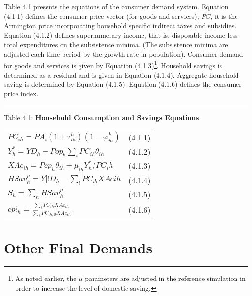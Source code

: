 \documentclass{article}
\begin{document}
Table 4.1 presents the equations of the consumer demand system. Equation (4.1.1) defines the consumer price vector (for goods and services), $PC$, it is the Armington price incorporating household specific indirect taxes and subsidies. Equation (4.1.2) defines supernumerary income, that is, disposable income less total expenditures on the subsistence minima. (The subsistence minima are adjusted each time period by the growth rate in population). Consumer demand for goods and services is given by Equation (4.1.3)\footnote{ As noted earlier, the $\mu$ parameters are adjusted in the reference simulation in order to increase the level of domestic saving.}. Household savings is determined as a residual and is given in Equation (4.1.4). Aggregate household saving is determined by Equation (4.1.5). Equation (4.1.6) defines the consumer price index.

\newpage

\noindent\rule{\linewidth}{0.4pt}
\begin{center}
\begin{large}
{\centering Table 4.1: \textbf{Household Consumption and Savings Equations} \par}

\begin{tabular}{>{\raggedright}p{} l}

$PC_{ih} = P\!A_i\left(1 + \tau^h_{ih}\right)\left(1 - \varphi^h_{ih}\right)$ & (4.1.1)\\[15pt]

$Y^*_h = Y\!D_h - Pop_h \displaystyle \sum_i PC_{ih} \theta_{ih}$ & (4.1.2)\\[15pt]

$XAc_{ih} = Pop_h\theta_{ih} + \mu_{ih}Y^*_h / PC_ih$ & (4.1.3) \\[15pt]

$HSav^p_h = Y]!D_h - \displaystyle \sum_i PC_{ih}XAc{ih}$ & (4.1.4) \\[15pt]

$S_h = \displaystyle \sum_h HSav^p_h$ & (4.1.5) \\[15pt]

$cpi_h = \frac{\displaystyle \sum_i PC_{ih}XAc_{ih}}{\displaystyle \sum_i PC_{ih, 0}XAc_{ih}}$ & (4.1.6) \\[20pt]

\hline
\end{tabular}
\end{large}
\end{center}

\section{Other Final Demands}
\end{document}
